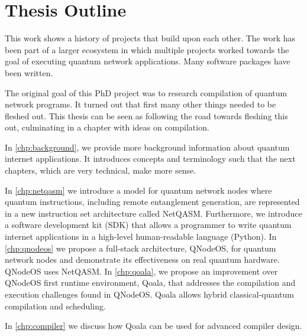 \section{Thesis Outline}
This work shows a history of projects that build upon each other.
The work has been part of a larger ecosystem in which multiple projects worked towards the goal of executing quantum network applications.
Many software packages have been written.

The original goal of this PhD project was to research compilation of quantum network programs.
It turned out that first many other things needed to be fleshed out.
This thesis can be seen as following the road towards fleshing this out, culminating in a chapter with ideas on compilation.

In \cref{chp:background}, we provide more background information about quantum internet applications.
It introduces concepts and terminology such that the next chapters, which are very technical, make more sense.

In \cref{chp:netqasm} we introduce a model for quantum network nodes where quantum instructions, including remote entanglement generation, are represented in a new instruction set architecture called NetQASM.
Furthermore, we introduce a software development kit (SDK) that allows a programmer to write quantum internet applications in a high-level human-readable language (Python).
In \cref{chp:qnodeos} we propose a full-stack architecture, QNodeOS, for quantum network nodes and demonstrate its effectiveness on real quantum hardware.
QNodeOS uses NetQASM.
In \cref{chp:qoala}, we propose an improvement over QNodeOS first runtime environment, Qoala, that addresses the compilation and execution challenges found in QNodeOS.
Qoala allows hybrid classical-quantum compilation and scheduling.

In \cref{chp:compiler} we discuss how Qoala can be used for advanced compiler design.




